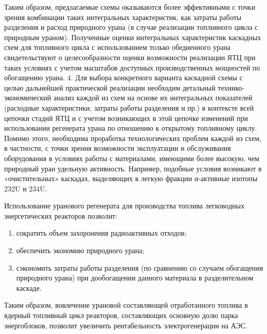 Таким образом, предлагаемые схемы оказываются более эффективными с точки зрения комбинации таких интегральных характеристик, как затраты работы разделения и расход природного урана (в случае реализации топливного цикла с природным ураном).
Полученные оценки интегральных характеристик каскадных схем для топливного цикла с использованием только обедненного урана свидетельствуют о целесообразности оценки возможности реализации ЯТЦ при таких условиях с учетом масштабов доступных производственных мощностей по обогащению урана.
4.	Для выбора конкретного варианта каскадной схемы с целью дальнейшей практической реализации необходим детальный технико-экономический анализ каждой из схем на основе их интегральных показателей (расходные характеристики, затраты работы разделения и пр.) в контексте всей цепочки стадий ЯТЦ и с учетом возникающих в этой цепочке изменений при использовании регенерата урана по отношению к открытому топливному циклу. 
Помимо этого, необходима проработка технологических проблем каждой из схем, в частности, с точки зрения возможности эксплуатации и обслуживания оборудования в условиях работы с материалами, имеющими более высокую, чем природный уран удельную активность. Например, подобные условия возникают в «очистительных» каскадах, выделяющих в легкую фракции α-активные изотопы 232U и 234U. 



Использование уранового регенерата для производства топлива легководных энергетических реакторов позволит: 
\begin{enumerate}
  \item сократить объем захоронения радиоактивных отходов; 
  \item обеспечить экономию природного урана;
  \item сэкономить затраты работы разделения (по сравнению со случаем обогащения природного урана) при дообогащении данного материала в разделительном каскаде. 
\end{enumerate}

Таким образом, вовлечение урановой составляющей отработанного топлива в ядерный топливный цикл реакторов, составляющих основную долю парка энергоблоков, позволит увеличить рентабельность электрогенерации на АЭС.



